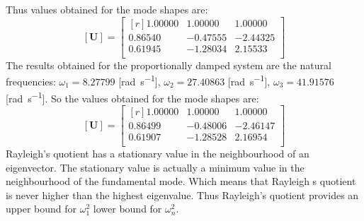Thus values obtained for the mode shapes are:
\begin{equation}
  \label{eq:raymodefree}
  [\mathbf{U}] = \begin{bmatrix*}[r]
	1.00000 & 1.00000 & 1.00000 \\
	0.86540 &-0.47555 &-2.44325 \\
	0.61945 &-1.28034 & 2.15533 \\
  \end{bmatrix*}
\end{equation}
The results obtained for the proportionally damped system are the natural 
frequencies:
\(\omega_{1} =  8.27799\) [\si{\radian\per\second}],
\(\omega_{2} = 27.40863\) [\si{\radian\per\second}],
\(\omega_{3} = 41.91576\) [\si{\radian\per\second}].
So the values obtained for the mode shapes are:
\begin{equation}\label{eq:raymodeprop}
  [\mathbf{U}] = 
	\begin{bmatrix*}[r]
  		1.00000 & 1.00000 & 1.00000 \\
		0.86499 &-0.48006 &-2.46147 \\
		0.61907 &-1.28528 & 2.16954 \\
	\end{bmatrix*}
\end{equation}
Rayleigh's quotient has a stationary value in the neighbourhood of an eigenvector. 
The stationary value is actually a minimum value in the neighbourhood of the 
fundamental mode.
Which means that Rayleigh s quotient is never higher than the highest eigenvalue. 
Thus Rayleigh's quotient provides an upper bound for \(\omega_{1}^{2}\) lower bound 
for \(\omega_{n}^{2}\).
